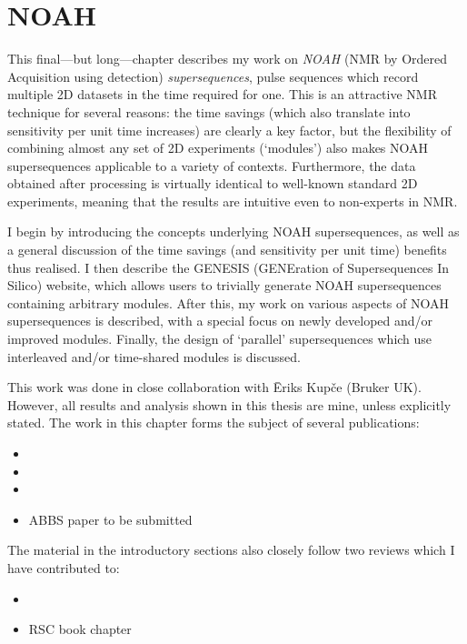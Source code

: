 \chapter{NOAH}

This final---but long---chapter describes my work on \textit{NOAH} (NMR by Ordered Acquisition using \proton{} detection) \textit{supersequences}, pulse sequences which record multiple 2D datasets in the time required for one.\autocite{Kupce2017ACIE}
This is an attractive NMR technique for several reasons: the time savings (which also translate into sensitivity per unit time increases) are clearly a key factor, but the flexibility of combining almost any set of 2D experiments (`modules') also makes NOAH supersequences applicable to a variety of contexts.
Furthermore, the data obtained after processing is virtually identical to well-known standard 2D experiments, meaning that the results are intuitive even to non-experts in NMR.

I begin by introducing the concepts underlying NOAH supersequences, as well as a general discussion of the time savings (and sensitivity per unit time) benefits thus realised.
I then describe the GENESIS (GENEration of Supersequences In Silico) website, which allows users to trivially generate NOAH supersequences containing arbitrary modules.
After this, my work on various aspects of NOAH supersequences is described, with a special focus on newly developed and/or improved modules.
Finally, the design of `parallel' supersequences which use interleaved and/or time-shared modules is discussed.

This work was done in close collaboration with {\=E}riks Kup{\v{c}}e (Bruker UK).
However, all results and analysis shown in this thesis are mine, unless explicitly stated.
The work in this chapter forms the subject of several publications:

\begin{itemize}
    \item {}
    \item {}
    \item {}
    \item ABBS paper to be submitted
\end{itemize}

The material in the introductory sections also closely follow two reviews which I have contributed to:
\begin{itemize}
    \item {}
    \item RSC book chapter
\end{itemize}









\printbibliography[heading=subbibnumbered]{}
